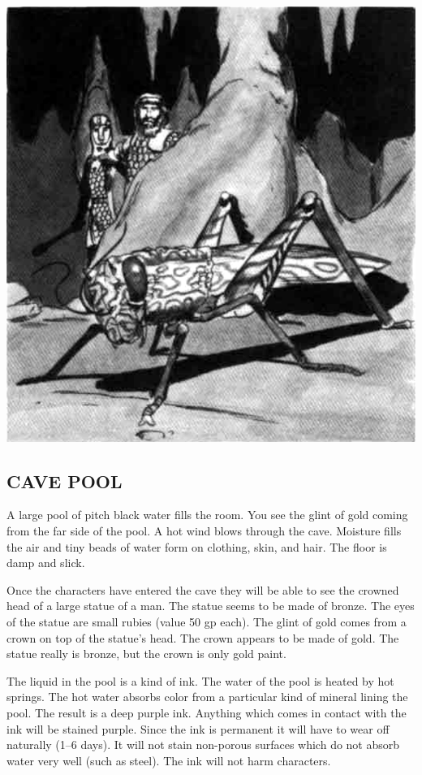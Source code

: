 \documentclass[letterpaper,serif,tightsqueeze]{module}
\begin{document}
\includegraphics[width=\linewidth]{CaveLocust.png}

\subsection{CAVE POOL}
\begin{boxtext}
A large pool of pitch black water fills the room. You see the glint
of gold coming from the far side of the pool. A hot wind blows
through the cave. Moisture fills the air and tiny beads of water
form on clothing, skin, and hair. The floor is damp and slick.
\end{boxtext}
Once the characters have entered the cave they will be able to see
the crowned head of a large statue of a man. The statue seems to
be made of bronze. The eyes of the statue are small rubies (value
50 gp each). The glint of gold comes from a crown on top of the
statue's head. The crown appears to be made of gold. The statue
really is bronze, but the crown is only gold paint.

The liquid in the pool is a kind of ink. The water of the pool is heated
by hot springs. The hot water absorbs color from a particular kind
of mineral lining the pool. The result is a deep purple ink. Anything
which comes in contact with the ink will be stained purple. Since
the ink is permanent it will have to wear off naturally (1--6 days). It
will not stain non-porous surfaces which do not absorb water very
well (such as steel). The ink will not harm characters.
\end{document}
